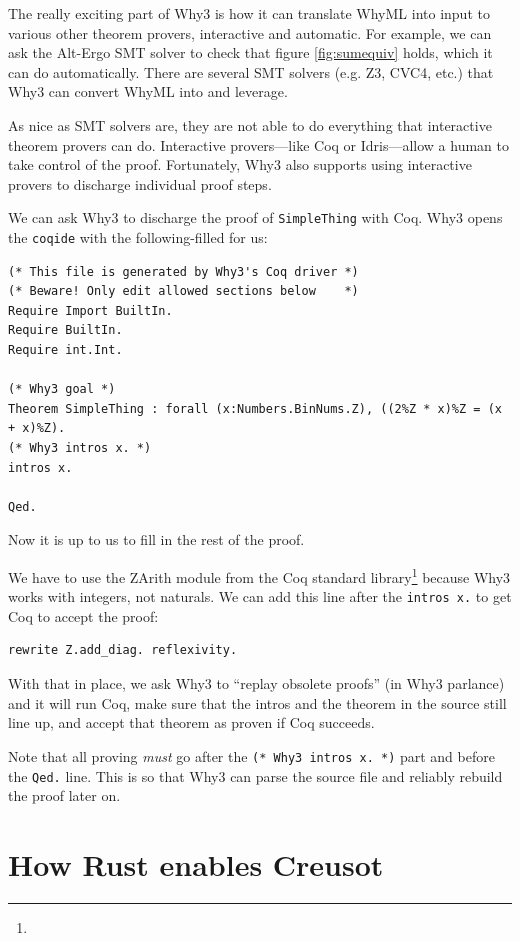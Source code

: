 \documentclass[12pt]{article}
\begin{document}
The really exciting part of Why3 is how it can translate WhyML into input to various other theorem provers, interactive and automatic.
For example, we can ask the Alt-Ergo SMT solver to check that figure \ref{fig:sumequiv} holds, which it can do automatically.
There are several SMT solvers (e.g. Z3, CVC4, etc.) that Why3 can convert WhyML into and leverage.


As nice as SMT solvers are, they are not able to do everything that interactive theorem provers can do.
Interactive provers---like Coq or Idris---allow a human to take control of the proof.
Fortunately, Why3 also supports using interactive provers to discharge individual proof steps.

We can ask Why3 to discharge the proof of \texttt{SimpleThing} with Coq.
Why3 opens the \texttt{coqide} with the following-filled for us:

\begin{verbatim}
(* This file is generated by Why3's Coq driver *)
(* Beware! Only edit allowed sections below    *)
Require Import BuiltIn.
Require BuiltIn.
Require int.Int.

(* Why3 goal *)
Theorem SimpleThing : forall (x:Numbers.BinNums.Z), ((2%Z * x)%Z = (x + x)%Z).
(* Why3 intros x. *)
intros x.

Qed.
\end{verbatim}

Now it is up to us to fill in the rest of the proof.

We have to use the ZArith module from the Coq standard library\footnote{} because Why3 works with integers, not naturals.
We can add this line after the \texttt{intros x.} to get Coq to accept the proof:

\begin{verbatim}
rewrite Z.add_diag. reflexivity.
\end{verbatim}

With that in place, we ask Why3 to ``replay obsolete proofs'' (in Why3 parlance) and it will run Coq, make sure that the intros and the theorem in the source still line up, and accept that theorem as proven if Coq succeeds.

Note that all proving \emph{must} go after the \texttt{(* Why3 intros x. *)} part and before the \texttt{Qed.} line.
This is so that Why3 can parse the source file and reliably rebuild the proof later on.

\section{How Rust enables Creusot}
\end{document}
